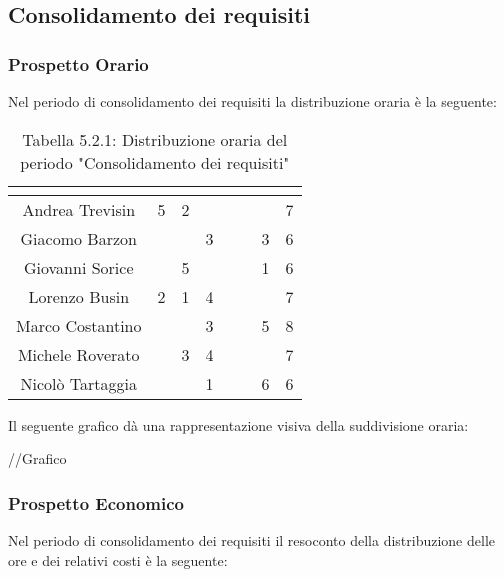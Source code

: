 \subsection{Consolidamento dei requisiti}

\subsubsection{Prospetto Orario}
Nel periodo di consolidamento dei requisiti la distribuzione oraria è la seguente:

\renewcommand{\arraystretch}{1.5}
\begin{table}[H]
\begin{center}
\begin{tabular}{|c|c|c|c|c|c|c|c|}
\hline
\rowcolor{title_row}
\textbf{\color{title_text}{Nome}} & \textbf{\color{title_text}{Resp.}} & \textbf{\color{title_text}{Ammi.}} & \textbf{\color{title_text}{Analist.}} & \textbf{\color{title_text}{Progett.}} & \textbf{\color{title_text}{Program.}} & \textbf{\color{title_text}{Verific.}} & \textbf{\color{title_text}{Totale}} \\ \hline
Andrea Trevisin  & 5 & 2 & & & & & 7 \\ \hline
Giacomo Barzon   & & & 3 & & & 3 & 6 \\ \hline
Giovanni Sorice  & & 5 & & & & 1 & 6 \\ \hline
Lorenzo Busin    & 2 & 1 & 4 & & & & 7 \\ \hline
Marco Costantino & & & 3 & & & 5 & 8 \\ \hline
Michele Roverato & & 3 & 4 & & & & 7 \\ \hline
Nicolò Tartaggia & & & 1 & & & 6 & 6 \\ \hline
\end{tabular}
\caption{Tabella 5.2.1: Distribuzione oraria del periodo "Consolidamento dei requisiti"\label{}}
\end{center}
\end{table}
\renewcommand{\arraystretch}{1}

Il seguente grafico dà una rappresentazione visiva della suddivisione oraria: \\
\begin{center}
//Grafico
\end{center}


\subsubsection{Prospetto Economico}
Nel periodo di consolidamento dei requisiti il resoconto della distribuzione delle ore e dei relativi costi è la seguente:

